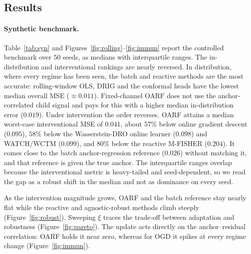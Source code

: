 \documentclass[12pt]{article}
\theoremstyle{plain}
\theoremstyle{remark}
\newcommand{\OARF}{\textsc{OARF}}
\begin{document}
\subsection{Results}

\paragraph{Synthetic benchmark.}
Table~\ref{tab:syn} and Figures~\ref{fig:rolling}--\ref{fig:immun} report the controlled
benchmark over $50$ seeds, as medians with interquartile ranges. The in-distribution and
interventional rankings are nearly reversed. In distribution, where every regime has been
seen, the batch and reactive methods are the most accurate: rolling-window OLS, DRIG and
the conformal heads have the lowest median overall MSE ($\approx 0.011$). Fixed-channel
\OARF{} does not use the anchor-correlated child signal and pays for this with a higher
median in-distribution error ($0.019$). Under intervention the order reverses. \OARF{} attains a median
worst-case interventional MSE of $0.041$, about $57\%$ below online gradient descent
($0.095$), $58\%$ below the Wasserstein-DRO online learner ($0.098$) and WATCH/WCTM
($0.099$), and $80\%$ below the reactive M-FISHER ($0.204$). It comes close to the batch
anchor-regression reference ($0.026$) without matching it, and that reference is given the
true anchor. The interquartile ranges overlap because the interventional metric is
heavy-tailed and seed-dependent, so we read the gap as a robust shift in the median and not
as dominance on every seed.

As the intervention magnitude grows, \OARF{} and the batch reference stay nearly flat while
the reactive and agnostic-robust methods climb steeply (Figure~\ref{fig:robust}). Sweeping
$\xi$ traces the trade-off between adaptation and robustness (Figure~\ref{fig:pareto}). The
update acts directly on the anchor--residual correlation: \OARF{} holds it near zero,
whereas for OGD it spikes at every regime change (Figure~\ref{fig:immun}).
\end{document}

